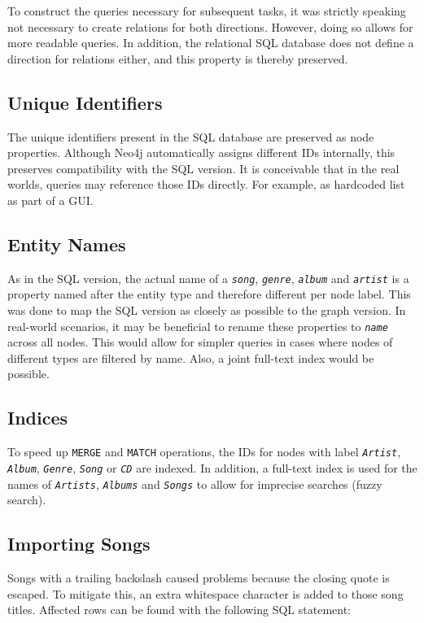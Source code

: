 \documentclass{article}
\newcommand{\name}[1]{\texttt{\emph{#1}}}
\begin{document}
To construct the queries necessary for subsequent tasks, it was strictly speaking not necessary to create relations for both directions. However, doing so allows for more readable queries. In addition, the relational SQL database does not define a direction for relations either, and this property is thereby preserved.

\subsection{Unique Identifiers}
The unique identifiers present in the SQL database are preserved as node properties. Although Neo4j automatically assigns different IDs internally, this preserves compatibility with the SQL version. It is conceivable that in the real worlds, queries may reference those IDs directly. For example, as hardcoded list as part of a GUI.

\subsection{Entity Names}
As in the SQL version, the actual name of a \name{song}, \name{genre}, \name{album} and \name{artist} is a property named after the entity type and therefore different per node label. This was done to map the SQL version as closely as possible to the graph version. In real-world scenarios, it may be beneficial to rename these properties to \name{name} across all nodes. This would allow for simpler queries in cases where nodes of different types are filtered by name. Also, a joint full-text index would be possible.

\subsection{Indices}
To speed up \texttt{MERGE} and \texttt{MATCH} operations, the IDs for nodes with label \name{Artist}, \name{Album}, \name{Genre}, \name{Song} or \name{CD} are indexed. In addition, a full-text index is used for the names of \name{Artists}, \name{Albums} and \name{Songs} to allow for imprecise searches (fuzzy search).

\subsection{Importing Songs}

Songs with a trailing backslash caused problems because the closing quote is escaped. To mitigate this, an extra whitespace character is added to those song titles. Affected rows can be found with the following SQL statement:
\end{document}
